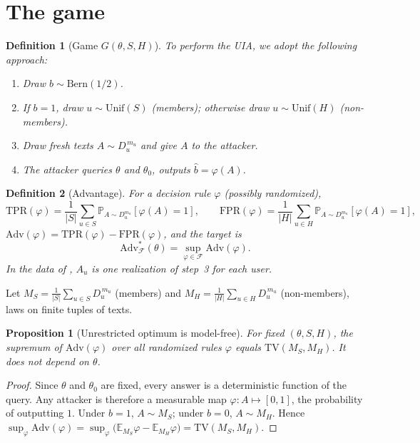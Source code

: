 \documentclass[11pt]{article}
\newtheorem{definition}{Definition}
\newtheorem{proposition}{Proposition}
\theoremstyle{remark}
\newcommand{\E}{\mathbb{E}}
\newcommand{\Prob}{\mathbb{P}}
\newcommand{\F}{\mathcal{F}}
\newcommand{\Adv}{\mathrm{Adv}}
\newcommand{\TPR}{\mathrm{TPR}}
\newcommand{\FPR}{\mathrm{FPR}}
\newcommand{\TV}{\mathrm{TV}}
\newcommand{\Unif}{\mathrm{Unif}}
\newcommand{\Bern}{\mathrm{Bern}}
\begin{document}
\section{The game}

\begin{definition}[Game $G(\theta, S, H)$]\label{def:game}
To perform the UIA, we adopt the following approach:
\begin{enumerate}
  \item Draw $b \sim \Bern(1/2)$.
  \item If $b = 1$, draw $u \sim \Unif(S)$ (members); otherwise draw $u \sim \Unif(H)$ (non-members).
  \item Draw fresh texts $A \sim D_u^{\,m_u}$ and give $A$ to the attacker.
  \item The attacker queries $\theta$ and $\theta_0$, outputs $\hat b = \varphi(A)$.
\end{enumerate}
\end{definition}

\begin{definition}[Advantage]
For a decision rule $\varphi$ (possibly randomized),
\[
\TPR(\varphi) = \frac{1}{|S|}\sum_{u\in S} \Prob_{A\sim D_u^{m_u}}[\varphi(A)=1],
\qquad
\FPR(\varphi) = \frac{1}{|H|}\sum_{u\in H} \Prob_{A\sim D_u^{m_u}}[\varphi(A)=1],
\]
$\Adv(\varphi) = \TPR(\varphi) - \FPR(\varphi)$, and the target is
\[
\Adv^{*}_{\F}(\theta) = \sup_{\varphi\in\F} \Adv(\varphi).
\]
In the data of \cite{kandpal2024}, $A_u$ is one realization of step~3 for each user.
\end{definition}

Let $M_S = \frac{1}{|S|}\sum_{u\in S} D_u^{\,m_u}$ (members) and
$M_H = \frac{1}{|H|}\sum_{u\in H} D_u^{\,m_u}$ (non-members), laws on finite tuples of texts.

\begin{proposition}[Unrestricted optimum is model-free]\label{prop:unrestricted}
For fixed $(\theta, S, H)$, the supremum of $\Adv(\varphi)$ over all randomized rules
$\varphi$ equals $\TV(M_S, M_H)$. It does not depend on $\theta$.
\end{proposition}

\begin{proof}
Since $\theta$ and $\theta_0$ are fixed, every answer is a deterministic function of the query.
Any attacker is therefore a measurable map $\varphi : A \mapsto [0,1]$, the probability of outputting $1$.
Under $b=1$, $A \sim M_S$; under $b=0$, $A \sim M_H$. Hence
$\sup_\varphi \Adv(\varphi) = \sup_{\varphi} \bigl(\E_{M_S}\varphi - \E_{M_H}\varphi\bigr) = \TV(M_S, M_H)$.
\end{proof}
\end{document}

